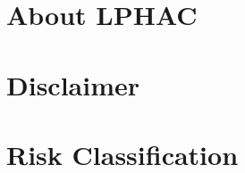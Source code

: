 \hypertarget{about-lphac}{%
\section{About LPHAC}\label{about-lphac}}



\hypertarget{disclaimer}{%
\section{Disclaimer}\label{disclaimer}}



\hypertarget{risk-classification}{%
\section{Risk Classification}\label{risk-classification}}



